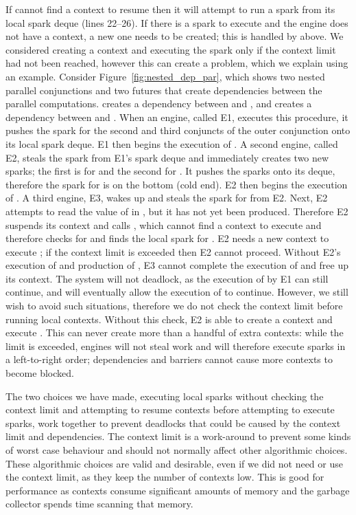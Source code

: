 If \idle cannot find a context to resume then it
will attempt to run a spark from its local spark deque (lines 22--26).
If there is a spark to execute and the engine does not have a context,
a new one needs to be created;
this is handled by \prepareengineforspark above.
We considered creating a context and executing the spark only if the
context limit had not been reached,
however this can create a problem, which we explain using an example.
Consider Figure~\ref{fig:nested_dep_par},
which shows two nested parallel conjunctions and
two futures that create dependencies between the parallel
computations.
 creates a dependency between  and ,
and  creates a dependency between  and .
When an engine, called E1,
executes this procedure,
it pushes the spark for the second and third
conjuncts of the outer conjunction onto its local spark deque.
E1 then begins the execution of .
A second engine, called E2,
steals the spark from E1's spark deque and immediately creates two new
sparks; the first is for  and the second for .
It pushes the sparks onto its deque,
therefore the spark for  is on the bottom (cold end).
E2 then begins the execution of .
A third engine, E3,
wakes up and steals the spark for  from E2.
Next,
E2 attempts to read the value of  in ,
but it has not yet been produced.
Therefore E2 suspends its context and calls \idle, which cannot find a context
to execute and therefore checks for and finds the local spark for .
E2 needs a new context to execute ;
if the context limit is exceeded then E2 cannot proceed.
Without E2's execution of  and production of ,
E3 cannot complete the execution of  and free up its context.
The system will not deadlock, as the execution of  by E1 can still
continue, and will eventually allow the execution of  to continue.
However, we still wish to avoid such situations,
therefore we do not check the context limit before running local contexts.
Without this check,
E2 is able to create a context and execute .
This can never create more than a handful of extra contexts:
while the limit is exceeded,
engines will not steal work and will therefore execute sparks in a
left-to-right order;
dependencies and barriers cannot cause more contexts to become blocked.

The two choices we have made,
executing local sparks without checking the context limit and
attempting to resume contexts before attempting to execute sparks,
work together to prevent deadlocks that could be caused by
the context limit and dependencies.
The context limit is a work-around to prevent some kinds of worst case
behaviour and should not normally affect other algorithmic choices.
These algorithmic choices are valid and desirable,
even if we did not need or use the context limit,
as they keep the number of contexts low.
This is good for performance as contexts consume significant amounts of
memory and the garbage collector spends time scanning that memory.

